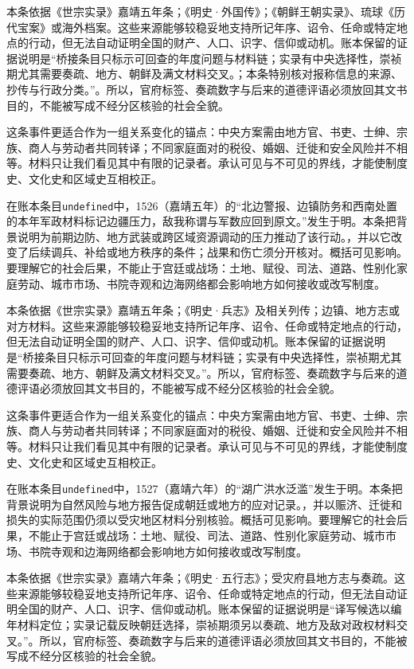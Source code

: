 本条依据《世宗实录》嘉靖五年条；《明史·外国传》；《朝鲜王朝实录》、琉球《历代宝案》或海外档案。这些来源能够较稳妥地支持所记年序、诏令、任命或特定地点的行动，但无法自动证明全国的财产、人口、识字、信仰或动机。账本保留的证据说明是“桥接条目只标示可回查的年度问题与材料链；实录有中央选择性，崇祯期尤其需要奏疏、地方、朝鲜及满文材料交叉。；本条特别核对报称信息的来源、抄传与行政分类。”。所以，官府标签、奏疏数字与后来的道德评语必须放回其文书目的，不能被写成不经分区核验的社会全貌。

这条事件更适合作为一组关系变化的锚点：中央方案需由地方官、书吏、士绅、宗族、商人与劳动者共同转译；不同家庭面对的税役、婚姻、迁徙和安全风险并不相等。材料只让我们看见其中有限的记录者。承认可见与不可见的界线，才能使制度史、文化史和区域史互相校正。

在账本条目\texttt{undefined}中，1526（嘉靖五年）的“北边警报、边镇防务和西南处置的本年军政材料标记边疆压力，敌我称谓与军数应回到原文。”发生于明。本条把背景说明为前期边防、地方武装或跨区域资源调动的压力推动了该行动。，并以它改变了后续调兵、补给或地方秩序的条件；战果和伤亡须分开核对。概括可见影响。要理解它的社会后果，不能止于宫廷或战场：土地、赋役、司法、道路、性别化家庭劳动、城市市场、书院寺观和边海网络都会影响地方如何接收或改写制度。

本条依据《世宗实录》嘉靖五年条；《明史·兵志》及相关列传；边镇、地方志或对方材料。这些来源能够较稳妥地支持所记年序、诏令、任命或特定地点的行动，但无法自动证明全国的财产、人口、识字、信仰或动机。账本保留的证据说明是“桥接条目只标示可回查的年度问题与材料链；实录有中央选择性，崇祯期尤其需要奏疏、地方、朝鲜及满文材料交叉。”。所以，官府标签、奏疏数字与后来的道德评语必须放回其文书目的，不能被写成不经分区核验的社会全貌。

这条事件更适合作为一组关系变化的锚点：中央方案需由地方官、书吏、士绅、宗族、商人与劳动者共同转译；不同家庭面对的税役、婚姻、迁徙和安全风险并不相等。材料只让我们看见其中有限的记录者。承认可见与不可见的界线，才能使制度史、文化史和区域史互相校正。

在账本条目\texttt{undefined}中，1527（嘉靖六年）的“湖广洪水泛滥”发生于明。本条把背景说明为自然风险与地方报告促成朝廷或地方的应对记录。，并以赈济、迁徙和损失的实际范围仍须以受灾地区材料分别核验。概括可见影响。要理解它的社会后果，不能止于宫廷或战场：土地、赋役、司法、道路、性别化家庭劳动、城市市场、书院寺观和边海网络都会影响地方如何接收或改写制度。

本条依据《世宗实录》嘉靖六年条；《明史·五行志》；受灾府县地方志与奏疏。这些来源能够较稳妥地支持所记年序、诏令、任命或特定地点的行动，但无法自动证明全国的财产、人口、识字、信仰或动机。账本保留的证据说明是“译写候选以编年材料定位；实录记载反映朝廷选择，崇祯期须另以奏疏、地方及敌对政权材料交叉。”。所以，官府标签、奏疏数字与后来的道德评语必须放回其文书目的，不能被写成不经分区核验的社会全貌。


